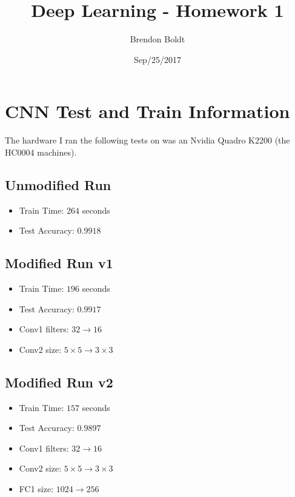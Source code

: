 \documentclass[a4paper]{article}
\title{Deep Learning - Homework 1}
\author{Brendon Boldt}
\date{Sep/25/2017}
\begin{document}

\maketitle

\section{CNN Test and Train Information}

The hardware I ran the following tests on was an Nvidia Quadro
K2200 (the HC0004 machines).
\subsection{Unmodified Run}
\begin{itemize}
    \item Train Time: $264$ seconds
    \item Test Accuracy: $0.9918$
\end{itemize}

\subsection{Modified Run v1}
\begin{itemize}
    \item Train Time: $196$ seconds
    \item Test Accuracy: $0.9917$
    \item Conv1 filters: $32 \rightarrow 16$
    \item Conv2 size: $5\times5 \rightarrow 3\times3$
\end{itemize}

\subsection{Modified Run v2}
\begin{itemize}
    \item Train Time: $157$ seconds
    \item Test Accuracy: $0.9897$
    \item Conv1 filters: $32 \rightarrow 16$
    \item Conv2 size: $5\times5 \rightarrow 3\times3$
    \item FC1 size: $1024 \rightarrow 256$
\end{itemize}


%





\end{document}
